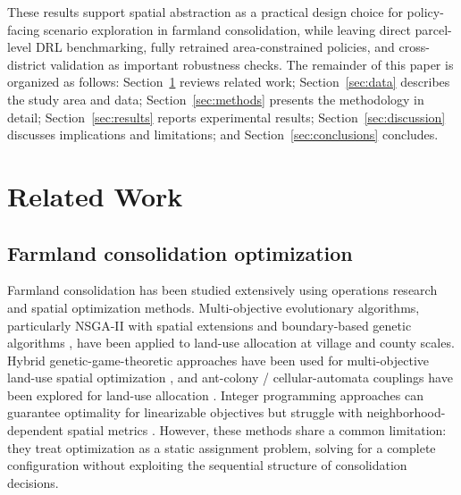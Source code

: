\documentclass[preprint,12pt]{elsarticle}
\begin{document}
These results support spatial abstraction as a practical design choice for policy-facing scenario exploration in farmland consolidation, while leaving direct parcel-level DRL benchmarking, fully retrained area-constrained policies, and cross-district validation as important robustness checks. The remainder of this paper is organized as follows: Section~\ref{sec:related} reviews related work; Section~\ref{sec:data} describes the study area and data; Section~\ref{sec:methods} presents the methodology in detail; Section~\ref{sec:results} reports experimental results; Section~\ref{sec:discussion} discusses implications and limitations; and Section~\ref{sec:conclusions} concludes.


\section{Related Work}
\label{sec:related}

\subsection{Farmland consolidation optimization}

Farmland consolidation has been studied extensively using operations research and spatial optimization methods. Multi-objective evolutionary algorithms, particularly NSGA-II \citep{deb2002fast} with spatial extensions \citep{cao2011sustainable} and boundary-based genetic algorithms \citep{cao2012spatial}, have been applied to land-use allocation at village and county scales. Hybrid genetic-game-theoretic approaches have been used for multi-objective land-use spatial optimization \citep{liu2012multi}, and ant-colony / cellular-automata couplings have been explored for land-use allocation \citep{li2011coupling}. Integer programming approaches can guarantee optimality for linearizable objectives but struggle with neighborhood-dependent spatial metrics \citep{aerts2003using}. However, these methods share a common limitation: they treat optimization as a static assignment problem, solving for a complete configuration without exploiting the sequential structure of consolidation decisions.
\end{document}
